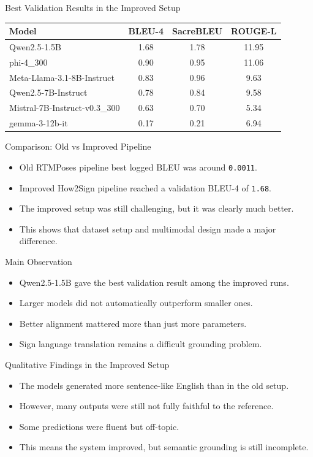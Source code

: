 \documentclass[aspectratio=169]{beamer}
\begin{document}
\begin{frame}{Best Validation Results in the Improved Setup}
\begin{table}
\centering
\small
\begin{tabular}{lccc}
\toprule
Model & BLEU-4 & SacreBLEU & ROUGE-L \\
\midrule
Qwen2.5-1.5B & 1.68 & 1.78 & 11.95 \\
phi-4\_300 & 0.90 & 0.95 & 11.06 \\
Meta-Llama-3.1-8B-Instruct & 0.83 & 0.96 & 9.63 \\
Qwen2.5-7B-Instruct & 0.78 & 0.84 & 9.58 \\
Mistral-7B-Instruct-v0.3\_300 & 0.63 & 0.70 & 5.34 \\
gemma-3-12b-it & 0.17 & 0.21 & 6.94 \\
\bottomrule
\end{tabular}
\end{table}
\end{frame}

\begin{frame}{Comparison: Old vs Improved Pipeline}
\begin{itemize}
  \item Old RTMPoses pipeline best logged BLEU was around \texttt{0.0011}.
  \item Improved How2Sign pipeline reached a validation BLEU-4 of \texttt{1.68}.
  \item The improved setup was still challenging, but it was clearly much better.
  \item This shows that dataset setup and multimodal design made a major difference.
\end{itemize}
\end{frame}

\begin{frame}{Main Observation}
\begin{itemize}
  \item Qwen2.5-1.5B gave the best validation result among the improved runs.
  \item Larger models did not automatically outperform smaller ones.
  \item Better alignment mattered more than just more parameters.
  \item Sign language translation remains a difficult grounding problem.
\end{itemize}
\end{frame}

\begin{frame}{Qualitative Findings in the Improved Setup}
\begin{itemize}
  \item The models generated more sentence-like English than in the old setup.
  \item However, many outputs were still not fully faithful to the reference.
  \item Some predictions were fluent but off-topic.
  \item This means the system improved, but semantic grounding is still incomplete.
\end{itemize}
\end{frame}
\end{document}
